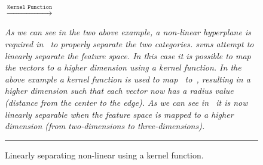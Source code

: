 \begin{figure}[!tb]
  \centering
  $\xrightarrow{\texttt{Kernel Function}}$
  \caption{Linearly separating non-linear using a kernel function.}
  \vspace{1mm}
  \footnotesize{\emph{As we can see in the two above example, a non-linear hyperplane is required in~ to properly separate the two categories. \gls{svm}s attempt to linearly separate the feature space. In this case it is possible to map the vectors to a higher dimension using a \emph{kernel function}. In the above example a kernel function is used to map~ to~, resulting in a higher dimension such that each vector now has a radius value (distance from the center to the edge). As we can see in~ it is now linearly separable when the feature space is mapped to a higher dimension (from two-dimensions to three-dimensions).}}
  \vspace{2mm}
  \hrule
  \label{fig:SVM_non-linear_kernel}
\end{figure}

